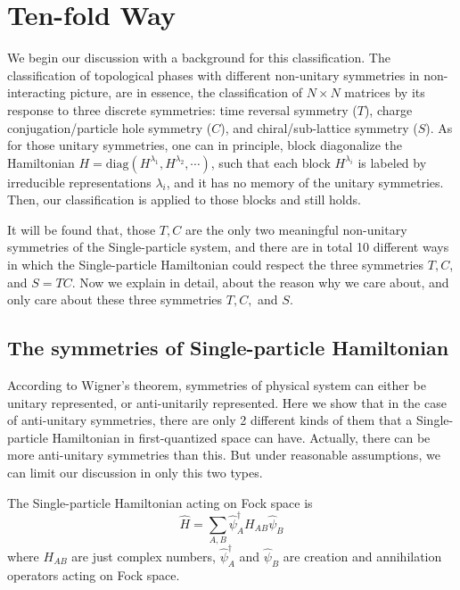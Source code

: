 \section{Ten-fold Way}

We begin our discussion with a background for this classification.  The
classification of topological phases with different non-unitary symmetries in
non-interacting picture, are in essence, the classification of $N\times N$
matrices by its response to three discrete symmetries: time reversal symmetry
($T$), charge conjugation/particle hole symmetry ($C$), and chiral/sub-lattice
symmetry ($S$). As for those unitary symmetries, one can in principle, block
diagonalize the Hamiltonian
$H=\mathrm{diag}(H^{\lambda_1},H^{\lambda_2},\cdots)$, such that each block
$H^{\lambda_i}$ is labeled by irreducible representations $\lambda_i$, and it
has no memory of the unitary symmetries. Then, our classification is
applied to those blocks and still holds.

It will be found that, those $T,C$ are the only two meaningful non-unitary
symmetries of the Single-particle system, and there are in total 10 different
ways in which the Single-particle Hamiltonian could respect the three symmetries
$T,C$, and $S=TC$. Now we explain in detail, about the reason why we care about, and only
care about these three symmetries $T,C,$ and $S$.

\subsection{The symmetries of Single-particle Hamiltonian}
\label{sec:The symmetries of Single-particle Hamiltonian}

According to Wigner's theorem, symmetries of physical system can either be
unitary represented, or anti-unitarily represented. Here we show that in the
case of anti-unitary symmetries, there are only 2 different kinds of them that a
Single-particle Hamiltonian in first-quantized space can have. Actually, there
can be more anti-unitary symmetries than this. But under reasonable assumptions,
we can limit our discussion in only this two types.

The Single-particle Hamiltonian acting on Fock space is
\begin{equation}
\label{eq:H-2nd}
\hat{H} = \sum_{A,B} \hat\psi^\dagger_A H_{AB} \hat\psi_{B}
\end{equation}
where $H_{AB}$ are just complex numbers, $\hat\psi^\dagger_A$ and $\hat\psi_B$
are creation and annihilation operators acting on Fock space.

